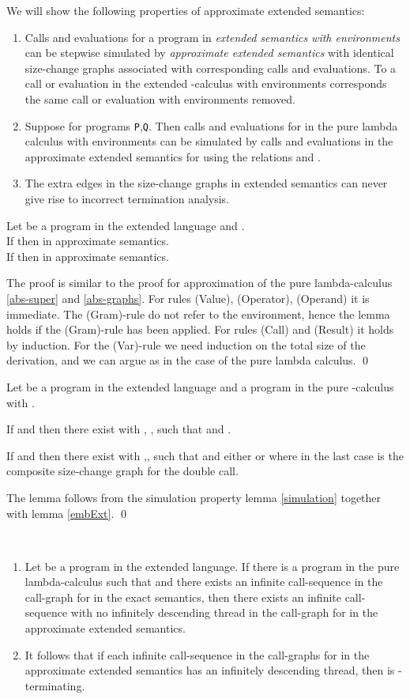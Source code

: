 \documentclass{LMCS}
\newcommand{\be}{\begin{enumerate}}
\newcommand{\ee}{\end{enumerate}}
\newcommand{\blem}{\begin{lem}}
\newcommand{\elem}{\end{lem}}
\newcommand{\bprf}{\proof}
\newcommand{\eprf}{\qed}
\newcommand{\bthm}{\begin{thm}}
\newcommand{\ethm}{\end{thm}}
\theoremstyle{definition}\newtheorem{env}[thm]{Environment}
\begin{document}
We will show the following properties of approximate extended semantics: 
\be[(1)]
\item Calls and evaluations for a program in {\em extended semantics with environments} can be stepwise simulated by {\em approximate extended semantics} with identical size-change graphs associated with corresponding calls and evaluations. To a call or evaluation in the extended -calculus with environments corresponds the same call or evaluation with environments removed.
\item 
Suppose   for programs  {\tt P},{\tt Q}. Then calls and evaluations for  in the pure lambda calculus with environments can be simulated by calls and evaluations in the approximate extended semantics for  using the relations   
and .
\item The extra edges in the size-change graphs in extended semantics can never give rise to incorrect termination analysis.
\ee

\blem \label{embExt}
Let  be a program in the extended language and .\\ 
If  then  in approximate semantics.\\
If  then  in approximate semantics.
\elem
\bprf
The proof is similar to the proof for approximation of the pure lambda-calculus \ref{abs-super} and \ref{abs-graphs}.
For rules (Value), (Operator), (Operand) it is immediate. The (Gram)-rule do not refer to the environment, hence the lemma holds if the (Gram)-rule has been applied. For rules (Call) and (Result) it holds by induction. For the (Var)-rule we need induction on the total size of the derivation, and we can argue as in the case of the pure lambda calculus.
\eprf


\blem \label{simulation-approx}
Let  be a program in the extended language and  a program in the pure -calculus with .

If  and  then there 
exist  with , ,  such that  and .

If  and  then there 
exist  with  ,,  such that  and either  or  where in the last case  is the composite size-change graph for the double call.
\elem

\bprf The lemma follows from the simulation property lemma \ref{simulation} together with lemma \ref{embExt}.
\eprf


\bthm\label{gamma-termination}\ 
\be[\em(1)]
\item Let  be a program in the extended language. If there is a program  in the pure lambda-calculus such that   and there exists an infinite call-sequence 
in the call-graph for  in the exact semantics, then there exists an infinite call-sequence with no infinitely descending thread in the call-graph for  in the approximate extended semantics.
\item It follows that if each infinite call-sequence  in the call-graphs for  in the approximate extended semantics has an infinitely descending thread, then  is -terminating.
\end{enumerate}
\ethm
\end{document}
